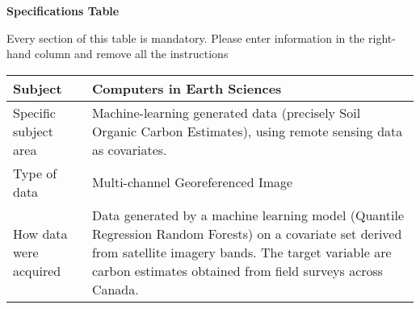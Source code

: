 \documentclass[times,final]{elsarticle.cls}
\begin{document}


{\fontsize{7.5pt}{9pt}\selectfont
\noindent\textbf{Specifications Table} 

Every section of this table is mandatory. 
Please enter information in the right-hand column and remove all the instructions
\begin{longtable}{|p{33mm}|p{94mm}|}
\hline
\endhead
\hline
\endfoot
Subject                & Computers in Earth Sciences\\
\hline                         
Specific subject area  & Machine-learning generated data (precisely Soil Organic Carbon Estimates), using remote sensing data as covariates.\\
\hline
Type of data           & Multi-channel Georeferenced Image \newline \\             
\newline                  
How data were acquired & Data generated by a machine learning model (Quantile                                Regression Random Forests) on a covariate set derived from                           satellite imagery bands. The target variable are carbon                              estimates obtained from field surveys across Canada. \\ 


\end{longtable}}
\end{document}

